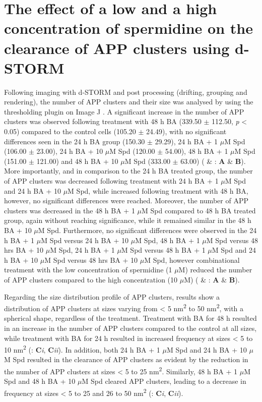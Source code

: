 \section{The effect of a low and a high concentration of spermidine on the clearance of APP clusters using d-STORM}
Following imaging with d-STORM and post processing (drifting, grouping and rendering), the number of APP clusters and their size was analysed by using the thresholding plugin on Image J \citep{Schindelin2012}. A significant increase in the number of APP clusters was observed following treatment with 48 h BA (339.50 $\pm$ 112.50, \textit{p} < 0.05) compared to the control cells (105.20 $\pm$ 24.49), with no significant differences seen in the 24 h BA group (150.30 $\pm$ 29.29), 24 h BA + 1 $\mu$M Spd (106.00 $\pm$ 23.00), 24 h BA + 10 $\mu$M Spd (120.00 $\pm$ 54.00), 48 h BA + 1 $\mu$M Spd (151.00 $\pm$ 121.00) and 48 h BA + 10 $\mu$M Spd (333.00 $\pm$ 63.00) ( \& : \textbf{A} \& \textbf{B}). More importantly, and in comparison to the 24 h BA treated group, the number of APP clusters was decreased following treatment with 24 h BA + 1 $\mu$M Spd and 24 h BA + 10 $\mu$M Spd, while increased following treatment with 48 h BA, however, no significant differences were reached. Moreover, the number of APP clusters was decreased in the 48 h BA + 1 $\mu$M Spd compared to 48 h BA treated group, again without reaching significance, while it remained similar in the 48 h BA + 10 $\mu$M Spd. Furthermore, no significant differences were observed in the 24 h BA + 1 $\mu$M Spd versus 24 h BA + 10 $\mu$M Spd, 48 h BA + 1 $\mu$M Spd versus 48 hrs BA + 10 $\mu$M Spd, 24 h BA + 1 $\mu$M Spd versus 48 h BA + 1 $\mu$M Spd and 24 h BA + 10 $\mu$M Spd versus 48 hrs BA + 10 $\mu$M Spd, however combinational treatment with the low concentration of spermidine (1 $\mu$M) reduced the number of APP clusters compared to the high concentration (10 $\mu$M) ( \& : \textbf{A} \& \textbf{B}).

Regarding the size distribution profile of APP clusters, results show a distribution of APP clusters at sizes varying from < 5 nm\textsuperscript{2} to 50 nm\textsuperscript{2}, with a spherical shape, regardless of the treatment. Treatment with BA for 48 h resulted in an increase in the number of APP clusters compared to the control at all sizes, while treatment with BA for 24 h resulted in increased frequency at sizes < 5 to 10 nm\textsuperscript{2} (: \textbf{C}\textit{i}, \textbf{C}\textit{ii}). In addition, both 24 h BA + 1 $\mu$M Spd and 24 h BA + 10 $\mu$M Spd resulted in the clearance of APP clusters as evident by the reduction in the number of APP clusters at sizes < 5 to 25 nm\textsuperscript{2}. Similarly, 48 h BA + 1 $\mu$M Spd and 48 h BA + 10 $\mu$M Spd cleared APP clusters, leading to a decrease in frequency at sizes < 5 to 25 and 26 to 50 nm\textsuperscript{2} (: \textbf{C}\textit{i}, \textbf{C}\textit{ii}). 

